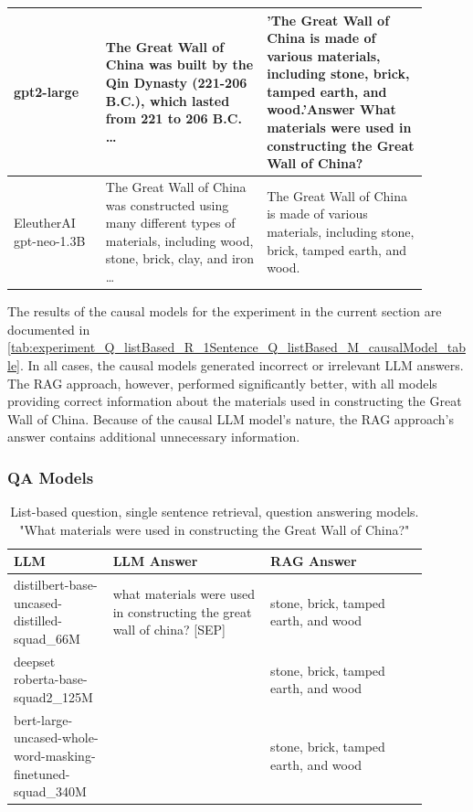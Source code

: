 \documentclass{wseas}
\begin{document}
\begin{table}[htbp]
\begin{tabular}{|p{0.20\linewidth}|p{0.35\linewidth}|p{0.35\linewidth}|}
    gpt2-large & The Great Wall of China was built by the Qin Dynasty (221-206 B.C.), which lasted from 221 to 206 B.C. \ldots{} & 'The Great Wall of China is made of various materials, including stone, brick, tamped earth, and wood.'Answer What materials were used in constructing the Great Wall of China? \\ \hline
    EleutherAI gpt-neo-1.3B & The Great Wall of China was constructed using many different types of materials, including wood, stone, brick, clay, and iron \ldots{} & The Great Wall of China is made of various materials, including stone, brick, tamped earth, and wood. \\ \hline
  \end{tabular}
\end{table}

The results of the causal models for the experiment in the current section are 
documented in \autoref{tab:experiment_Q_listBased_R_1Sentence_Q_listBased_M_causalModel_table}. 
In all cases, the causal models generated incorrect or irrelevant LLM answers. 
The RAG approach, however, performed significantly better, with all models providing correct 
information about the materials used in constructing the Great Wall of China.
Because of the causal LLM model's nature, the RAG approach's answer contains additional unnecessary information.

\subsubsection{QA Models}


\begin{table}[htbp]
  \centering
  \caption{List-based question, single sentence retrieval, question answering models. "What materials were used in constructing the Great Wall of China?"} %
  \label{tab:experiment_Q_listBased_R_1Sentence_Q_listBased_M_QaModels_table} 
  \begin{tabular}{|p{0.20\linewidth}|p{0.35\linewidth}|p{0.35\linewidth}|}
    \hline
    \textbf{LLM} & \textbf{LLM Answer} & \textbf{RAG Answer} \\ \hline
    distilbert-base-uncased-distilled-squad\_66M & what materials were used in constructing the great wall of china? {[}SEP{]} & stone, brick, tamped earth, and wood \\ \hline
    deepset roberta-base-squad2\_125M & & stone, brick, tamped earth, and wood \\ \hline
    bert-large-uncased-whole-word-masking-finetuned-squad\_340M & & stone, brick, tamped earth, and wood \\ \hline
  \end{tabular}
\end{table}
\end{document}

